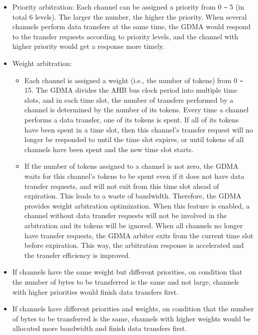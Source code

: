 \documentclass[main\_\_EN.tex]{subfiles}
\begin{document}
\begin{itemize}
    \item Priority arbitration: Each channel can be assigned a priority from 0 \verb+~+ 5 (in total 6 levels). The larger the number, the higher the priority. When several channels perform data transfers at the same time, the GDMA would respond to the transfer requests according to priority levels, and the channel with higher priority would get a response more timely.
    \item Weight arbitration:
        \begin{itemize}
            \item Each channel is assigned a weight (i.e., the number of tokens) from 0 \verb+~+ 15. The GDMA divides the AHB bus clock period into multiple time slots, and in each time slot, the number of transfers performed by a channel is determined by the number of its tokens. Every time a channel performs a data transfer, one of its tokens is spent. If all of its tokens have been spent in a time slot, then this channel's transfer request will no longer be responded to until the time slot expires, or until tokens of all channels have been spent and the new time slot starts.
            \item If the number of tokens assigned to a channel is not zero, the GDMA waits for this channel's tokens to be spent even if it does not have data transfer requests, and will not exit from this time slot ahead of expiration. This leads to a waste of bandwidth. Therefore, the GDMA provides weight arbitration optimization. When this feature is enabled, a channel without data transfer requests will not be involved in the arbitration and its tokens will be ignored. When all channels no longer have transfer requests, the GDMA arbiter exits from the current time slot before expiration. This way, the arbitration response is accelerated and the transfer efficiency is improved.
        \end{itemize}
\end{itemize}


\begin{tiplisting}
\vspace{-2em}
\begin{itemize}
    \item If channels have the same weight but different priorities, on condition that the number of bytes to be transferred is the same and not large, channels with higher priorities would finish data transfers first.
    \item If channels have different priorities and weights, on condition that the number of bytes to be transferred is the same, channels with higher weights would be allocated more bandwidth and finish data transfers first.
\end{itemize}
\end{tiplisting}
\end{document}

